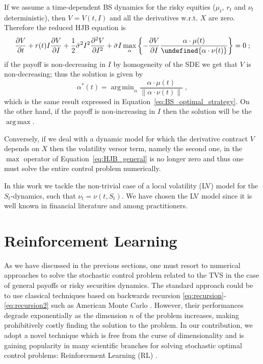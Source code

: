 \documentclass[11pt]{article}
\let\norm\undefined %
\DeclarePairedDelimiter\norm{\lVert}{\rVert}
\DeclareMathOperator*{\argmax}{arg\,max}
\DeclareMathOperator*{\argmin}{arg\,min}
\begin{document}
If we assume a time-dependent BS dynamics for the risky equities ($\mu_t$, $r_t$ and $\nu_t$ deterministic), then $V = V(t,I)$ and all the derivatives w.r.t. $X$ are zero. Therefore the reduced HJB equation is
\begin{equation}
	\frac{\partial V}{\partial t} +  r(t) I \frac{\partial V}{\partial I}  + \frac{1}{2}\bar{\sigma}^2I^2\frac{\partial^2V}{\partial I^2} + \bar{\sigma}I\max_\alpha \left\{ -\frac{\partial V}{\partial I}   \frac{\alpha \cdot \mu(t)}{\norm{\alpha \cdot \nu(t)}}\right\} = 0 \; ;
\end{equation}
if the payoff is non-decreasing in $I$ by homogeneity of the SDE we get that $V$ is non-decreasing; thus the solution is given by
\begin{equation}
 \alpha^*(t) = \argmin_\alpha \frac{\alpha \cdot \mu(t)}{\|\alpha \cdot \nu(t)\|} \; ,
	\end{equation}
which is the same result expressed in Equation~\eqref{eq:BS_optimal_strategy}. On the other hand, if the payoff is non-increasing in $I$ then the solution will be the $\argmax$.

Conversely, if we deal with a dynamic model for which the derivative contract $V$ depends on $X$ then the volatility versor term, namely the second one, in the $\max$ operator of Equation~\eqref{eq:HJB_general} is no longer zero and thus one must solve the entire control problem numerically. 

In this work we tackle the non-trivial case of a local volatility (LV) model for the $S_t$-dynamics, such that $\nu_t = \nu(t,S_t)$. We have chosen the LV model since it is well known in financial literature and among practitioners.


\section{Reinforcement Learning}\label{sec:RL}
As we have discussed in the previous sections, one must resort to numerical approaches to solve the stochastic control problem related to the TVS in the case of general payoffs or risky securities dynamics. The standard approach could be to use classical techniques based on backwards recursion \eqref{eq:recursion}-\eqref{eq:recursion2} such as American Monte Carlo \citep{Longstaff2001}. However, their performances degrade exponentially as the dimension $n$ of the problem increases, making prohibitively costly finding the solution to the problem. In our contribution, we adopt a novel technique which is free from the curse of dimensionality and is gaining popularity in many scientific branches for solving stochastic optimal control problems: Reinforcement Learning (RL) \citep{Sutton2018}. 
\end{document}

